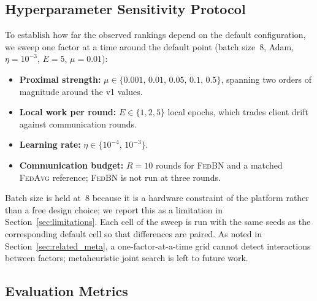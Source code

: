 \documentclass[journal]{IEEEtran}
\newcommand{\fedavg}{\textsc{FedAvg}}
\newcommand{\fedbn}{\textsc{FedBN}}
\begin{document}
\subsection{Hyperparameter Sensitivity Protocol}
\label{sec:sensitivity}

To establish how far the observed rankings depend on the default configuration, we sweep one factor at a time around the default point (batch size~8, Adam, $\eta=10^{-3}$, $E=5$, $\mu=0.01$):

\begin{itemize}
    \item \textbf{Proximal strength:} $\mu \in \{0.001,\, 0.01,\, 0.05,\, 0.1,\, 0.5\}$, spanning two orders of magnitude around the v1 values.
    \item \textbf{Local work per round:} $E \in \{1, 2, 5\}$ local epochs, which trades client drift against communication rounds.
    \item \textbf{Learning rate:} $\eta \in \{10^{-4},\, 10^{-3}\}$.
    \item \textbf{Communication budget:} $R = 10$ rounds for \fedbn{} and a matched \fedavg{} reference; \fedbn{} is not run at three rounds.
\end{itemize}

Batch size is held at~8 because it is a hardware constraint of the platform rather than a free design choice; we report this as a limitation in Section~\ref{sec:limitations}. Each cell of the sweep is run with the same seeds as the corresponding default cell so that differences are paired. As noted in Section~\ref{sec:related_meta}, a one-factor-at-a-time grid cannot detect interactions between factors; metaheuristic joint search is left to future work.

\subsection{Evaluation Metrics}
\label{sec:metrics}
\end{document}

